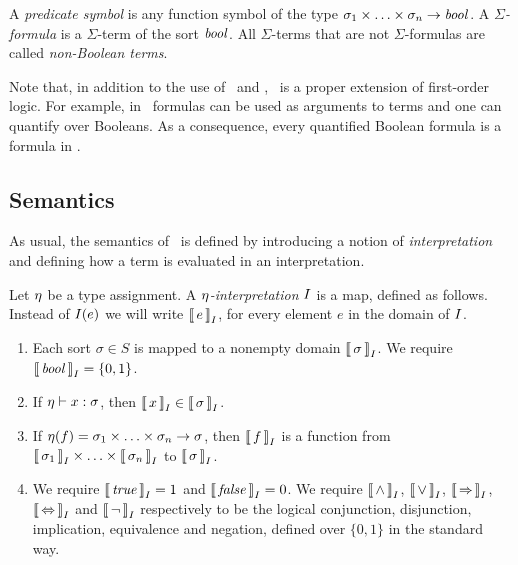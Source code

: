 \begin{definition}
  A \emph{predicate symbol} is any function symbol of the type $\sigma_1 \times \ldots \times \sigma_n \to \mathit{bool}$.
  A \emph{$\Sigma$-formula} is a $\Sigma$-term of the sort $\mathit{bool}$. All $\Sigma$-terms that are not $\Sigma$-formulas are called \emph{non-Boolean terms}. \QED
\end{definition}

Note that, in addition to the use of \LETIN\ and \ITE, \folb\ is a proper extension of first-order logic. For example, in \folb\ formulas can be used as arguments to terms and one can quantify over Booleans. As a consequence, every quantified Boolean formula is a formula in \folb.

\subsection{Semantics}

As usual, the semantics of \folb\ is defined by introducing a notion of \emph{interpretation} and defining how a term is evaluated in an interpretation.

\begin{definition}\label{def:folb-interpretation}
  Let $\eta$ be a type assignment.
  A \emph{$\eta$-interpretation} $I$ is a map, defined as follows. Instead of $I(e)$ we will write $\left\llbracket\,{e}\,\right\rrbracket_{I}$, for every element $e$ in the domain of $I$.
  \begin{enumerate}
    \item Each sort $\sigma \in S$ is mapped to a nonempty domain $\left\llbracket\,{\sigma}\,\right\rrbracket_{I}$. We require $\left\llbracket\,{\mathit{bool}}\,\right\rrbracket_{I} = \left\{0, 1\right\}$.

    \item If $\eta \vdash x:\sigma$, then $\left\llbracket\,{x}\,\right\rrbracket_{I} \in \left\llbracket\,{\sigma}\,\right\rrbracket_{I}$.

    \item If $\eta(f) = \sigma_1 \times \ldots \times \sigma_n \to \sigma$, then $\left\llbracket\,{f}\,\right\rrbracket_{I}$ is a function from $\left\llbracket\,{\sigma_1}\,\right\rrbracket_{I} \times \ldots \times \left\llbracket\,{\sigma_n}\,\right\rrbracket_{I}$ to $\left\llbracket\,{\sigma}\,\right\rrbracket_{I}$.

    \item We require $\left\llbracket\,{\mathit{true}}\,\right\rrbracket_{I} = 1$ and $\left\llbracket\,{\mathit{false}}\,\right\rrbracket_{I} = 0$. We require $\left\llbracket\,{\wedge}\,\right\rrbracket_{I}$, $\left\llbracket\,{\vee}\,\right\rrbracket_{I}$, $\left\llbracket\,{\Rightarrow}\,\right\rrbracket_{I}$, $\left\llbracket\,{\Leftrightarrow}\,\right\rrbracket_{I}$ and $\left\llbracket\,{\neg}\,\right\rrbracket_{I}$ respectively to be the logical conjunction, disjunction, implication, equivalence and negation, defined over $\{0,1\}$ in the standard way. \QED
  \end{enumerate}
\end{definition}

